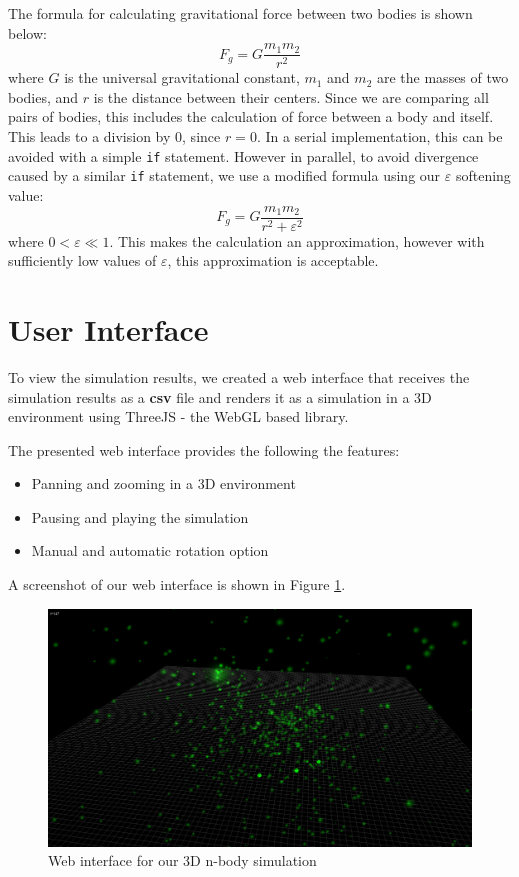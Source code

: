 \documentclass[10pt,a4paper]{article}
\begin{document}
	The formula for calculating gravitational force between two bodies is shown below:
	\begin{equation}
	F_g = G\frac{m_1 m_2}{r^2}
	\end{equation}
	where $G$ is the universal gravitational constant, $m_1$ and $m_2$ are the masses of two bodies, and $r$ is the distance between their centers. Since we are comparing all pairs of bodies, this includes the calculation of force between a body and itself. This leads to a division by 0, since $r = 0$. In a serial implementation, this can be avoided with a simple \texttt{if} statement. However in parallel, to avoid divergence caused by a similar \texttt{if} statement, we use a modified formula using our $\varepsilon$ softening value:
	\begin{equation}
	F_g = G\frac{m_1 m_2}{r^2 + \varepsilon^2}
	\end{equation}
	where $0 < \varepsilon \ll 1$. This makes the calculation an approximation, however with sufficiently low values of $\varepsilon$, this approximation is acceptable.
	
	\section{User Interface}
	To view the simulation results, we created a web interface that receives the simulation results as a \textbf{csv} file and renders it as a simulation in a 3D environment using ThreeJS - the WebGL based library.
	
	The presented web interface provides the following the features: 
	\begin{itemize}
		\item Panning and zooming in a 3D environment
		\item Pausing and playing the simulation 
		\item Manual and automatic rotation option
	\end{itemize}
	
	A screenshot of our web interface is shown in Figure \ref{scr}.
	\begin{figure}
		\centering
		\includegraphics[scale=0.3]{scr.png}
		\caption{Web interface for our 3D n-body simulation}
		\label{scr}
	\end{figure}
	
\end{document}
